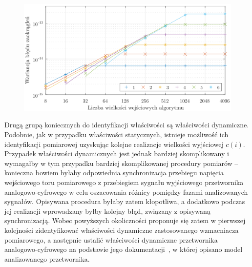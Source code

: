 \begin{figure}[htb!]
\begin{center}
\includegraphics{obrazki/dwt_rerror_coif5}
\end{center}
\end{figure}

Drugą grupą koniecznych do identyfikacji właściwości są właściwości dynamiczne. Podobnie, jak w przypadku właściwości statycznych, istnieje możliwość ich identyfikacji pomiarowej uzyskując kolejne realizacje wielkości wyjściowej $c(i)$. Przypadek właściwości dynamicznych jest jednak bardziej skomplikowany i wymagałby w tym przypadku bardziej skomplikowanej procedury pomiarów -- konieczna bowiem byłaby odpowiednia synchronizacja przebiegu napięcia wejściowego toru pomiarowego z przebiegiem sygnału wyjściowego przetwornika analogowo-cyfrowego w celu oszacowania różnicy pomiędzy fazami analizowanych sygnałów. Opisywana procedura byłaby zatem kłopotliwa, a dodatkowo podczas jej realizacji wprowadzany byłby kolejny błąd, związany z opisywaną synchronizacją. Wobec powyższych okoliczności proponuje się zatem w pierwszej kolejności zidentyfikować właściwości dynamiczne zastosowanego wzmacniacza pomiarowego, a następnie ustalić właściwości dynamiczne przetwornika analogowo-cyfrowego na podstawie jego dokumentacji~\cite{stm_f411}, w której opisano model analizowanego przetwornika.


